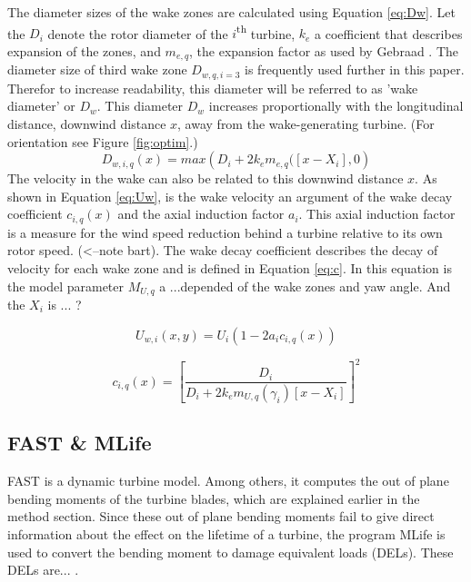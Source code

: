 The diameter sizes of the wake zones are calculated using Equation \ref{eq:Dw}. Let the $D_i$ denote the rotor diameter of the $i${\textsuperscript{th}} turbine, $k_e$ a coefficient that describes expansion of the zones, and $m_{e,q}$, the expansion factor as used by Gebraad \cite{Gebraad2016}. The diameter size of third wake zone $D_{w,q,i=3}$ is frequently used further in this paper. Therefor to increase readability, this diameter will be referred to as 'wake diameter' or $D_w$. This diameter $D_w$ increases proportionally with the longitudinal distance, downwind distance $x$, away from the wake-generating turbine. (For orientation see Figure \ref{fig:optim}.)
\begin{equation}
\label{eq:Dw}
D_{w,i,q}(x) = max({D_i + 2k_em_{e,q}([x - X_i],0} )
\end{equation}
The velocity in the wake can also be related to this downwind distance $x$. As shown in Equation \ref{eq:Uw}, is the wake velocity an argument of the wake decay coefficient $c_{i,q}(x)$ and the axial induction factor $a_i$. This axial induction factor is a measure for the wind speed reduction behind a turbine relative to its own rotor speed. (<--note bart). The wake decay coefficient describes the decay of velocity for each wake zone and is defined in Equation \ref{eq:c}. In this equation is the model parameter $M_{U,q}$ a ...depended of the wake zones and yaw angle\cite{Gebraad2016}. And the $X_i$ is ... ?

\begin{equation}
\label{eq:Uw}
U_{w,i}(x,y) = U_i\left( {1-2a_{i}c_{i,q}(x)} \right)
\end{equation} 

\begin{equation}
\label{eq:c}
c_{i,q}(x) = \left[ \frac{D_i}{D_i + 2k_em_{U,q}(\gamma_i)[x - X_i]} \right]^2
\end{equation}



\subsection{FAST \& MLife} \label{sec:fast} FAST is a dynamic turbine model\cite{Jonkman2005}. Among others, it computes the out of plane bending moments of the turbine blades, which are explained earlier in the method section. Since these out of plane bending moments fail to give direct information about the effect on the lifetime of a turbine, the program MLife is used to convert the bending moment to damage equivalent loads (DELs). These DELs are... \cite{Mlife}.


